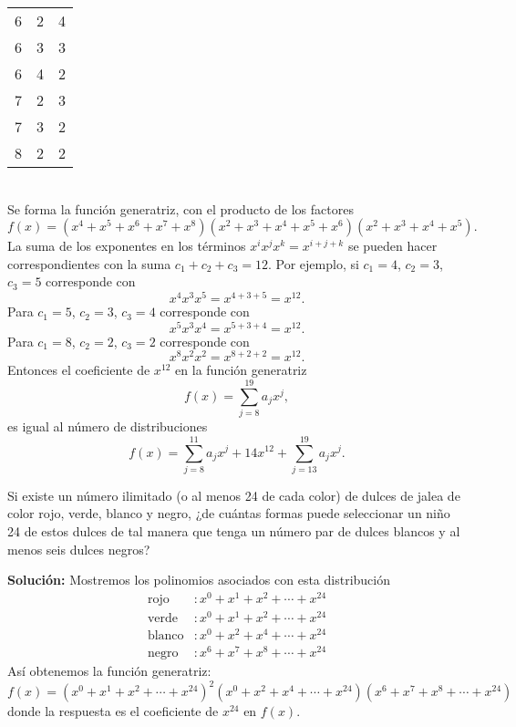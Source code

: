 \begin{myexample}
\begin{minipage}[r]{0.25\textwidth}
\begin{center}
\begin{NiceTabular}[hvlines-except-borders,rules={color=white,width=1pt}]{ccc}
                6 & 2 & 4 \\
                6 & 3 & 3 \\
                6 & 4 & 2 \\
                7 & 2 & 3 \\
                7 & 3 & 2 \\
                8 & 2 & 2
            \end{NiceTabular}
            \label{HEJFREJFGJHJFHGJHJGHRT}
        \end{center}
    \end{minipage}
    ~\\

    \noindent
    Se forma la función generatriz, con el producto de los factores
    $$f(x) = \left( x^{4} + x^{5} + x^{6} + x^{7} + x^{8} \right) \left( x^{2} + x^{3} + x^{4} + x^{5} + x^{6} \right) \left( x^{2} + x^{3} + x^{4} + x^{5} \right).$$
    La suma de los exponentes en los términos $x^{i} x^{j} x^{k} = x^{i+j+k}$ se pueden hacer correspondientes con la suma $c_1 + c_2 + c_3 = 12$. Por ejemplo, si $c_1 = 4$, $c_2 = 3$, $c_3 = 5$ corresponde con
    $$x^{4} x^{3} x^{5} = x^{4+3+5} = x^{12}.$$
    Para $c_1 = 5$, $c_2 = 3$, $c_3 = 4$ corresponde con
    $$x^{5} x^{3} x^{4} = x^{5+3+4} = x^{12}.$$
    Para $c_1 = 8$, $c_2 = 2$, $c_3 = 2$ corresponde con
    $$x^{8} x^{2} x^{2} = x^{8+2+2} = x^{12}.$$
    Entonces el coeficiente de $x^{12}$ en la función generatriz
    $$f(x) = \sum_{j=8}^{19} a_j x^{j},$$
    es igual al número de distribuciones
    $$f(x) = \sum_{j=8}^{11} a_j x^{j} + 14x^{12} + \sum_{j=13}^{19} a_j x^{j}.$$
\end{myexample}

\begin{myexample}
    Si existe un número ilimitado (o al menos 24 de cada color) de dulces de jalea de color rojo, verde, blanco y negro, ¿de cuántas formas puede seleccionar un niño 24 de estos dulces de tal manera que tenga un número par de dulces blancos y al menos seis dulces negros?

    \tcblower
    \textbf{\color{jblueleft}Solución:} Mostremos los polinomios asociados con esta distribución
    \begin{align*}
        \text{rojo} & : x^0 + x^1 + x^2 + \cdots + x^{24} \\
        \text{verde} & : x^0 + x^1 + x^2 + \cdots + x^{24} \\
        \text{blanco} & : x^0 + x^2 + x^4 + \cdots + x^{24} \\
        \text{negro} & : x^6 + x^7 + x^8 + \cdots + x^{24}
    \end{align*}
    Así obtenemos la función generatriz:
    $$f(x) = \left( x^0 + x^1 + x^2 + \cdots + x^{24} \right)^2 \left( x^0 + x^2 + x^4 + \cdots + x^{24} \right) \left( x^6 + x^7 + x^8 + \cdots + x^{24} \right)$$
    donde la respuesta es el coeficiente de $x^{24}$ en $f(x)$.
\end{myexample}

